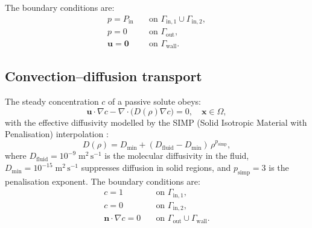 \documentclass[12pt]{article}
\begin{document}
The boundary conditions are:
\begin{align}
p = P_{\text{in}} \quad &\text{on } \Gamma_{\text{in},1} \cup \Gamma_{\text{in},2}, \label{eq:p_in}\\
p = 0 \quad &\text{on } \Gamma_{\text{out}}, \label{eq:p_out}\\
\mathbf{u} = \mathbf{0} \quad &\text{on } \Gamma_{\text{wall}}. \label{eq:u_wall}
\end{align}

\subsection{Convection–diffusion transport}
The steady concentration $c$ of a passive solute obeys:
\begin{equation}
\mathbf{u} \cdot \nabla c - \nabla \cdot \bigl(D(\rho) \nabla c \bigr) = 0, \quad \mathbf{x} \in \Omega, \label{eq:cd}
\end{equation}
with the effective diffusivity modelled by the SIMP (Solid Isotropic Material with Penalisation) interpolation \cite{alexandersen2014, alexandersen2020}:
\begin{equation}
D(\rho) = D_{\min} + (D_{\text{fluid}} - D_{\min})\,\rho^{p_{\text{simp}}}, \label{eq:D}
\end{equation}
where $D_{\text{fluid}} = 10^{-9}\;\text{m}^2\,\text{s}^{-1}$ is the molecular diffusivity in the fluid, $D_{\min} = 10^{-15}\;\text{m}^2\,\text{s}^{-1}$ suppresses diffusion in solid regions, and $p_{\text{simp}} = 3$ is the penalisation exponent. The boundary conditions are:
\begin{align}
c = 1 \quad &\text{on } \Gamma_{\text{in},1}, \label{eq:c_in1}\\
c = 0 \quad &\text{on } \Gamma_{\text{in},2}, \label{eq:c_in2}\\
\mathbf{n} \cdot \nabla c = 0 \quad &\text{on } \Gamma_{\text{out}} \cup \Gamma_{\text{wall}}. \label{eq:c_flux}
\end{align}
\end{document}
